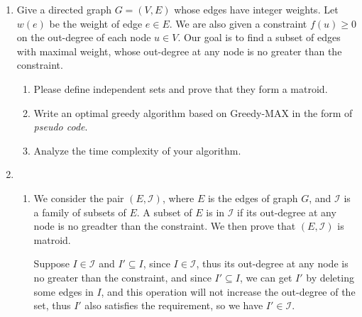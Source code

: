 \documentclass[12pt,a4paper]{article}
\makeatletter
\newtheorem*{solution}{Solution}
\theoremstyle{definition}
\renewenvironment{solution}[1][Solution] {\par\pushQED{\qed}\normalfont\topsep6\p@\@plus6\p@\relax\trivlist\item[\hskip\labelsep\bfseries#1\@addpunct{.}]\ignorespaces}{\popQED\endtrivlist\@endpefalse} \makeatother
\makeatother
\begin{document}
	\begin{enumerate}
		\item Give a directed graph $G=(V,E)$ whose edges have integer weights. Let $w(e)$ be the weight of edge $e\in E$. We are also given a constraint $f(u)\geq 0$ on the out-degree of each node $u\in V$. Our goal is to find a subset of edges with maximal weight, whose out-degree at any node is no greater than the constraint.
		\begin{enumerate}
			\item Please define independent sets and prove that they form a matroid.
			\item Write an optimal greedy algorithm based on Greedy-MAX in the form of \emph{pseudo code}.
			\item Analyze the time complexity of your algorithm.
		\end{enumerate}
		\begin{solution}
			\noindent
			\begin{enumerate}
				\item We consider the pair $(E,\mathcal{I})$, where $E$ is the edges of graph $G$, and $\mathcal{I}$ is a family of subsets of $E$. A subset of $E$ is in $\mathcal{I}$ if its out-degree at any node is no greadter than the constraint. We then prove that $(E,\mathcal{I})$ is matroid.
				
				Suppose $I \in \mathcal{I}$ and $I' \subseteq I$, since $I \in \mathcal{I}$, thus its out-degree at any node is no greater than the constraint, and since $I' \subseteq I$, we can get $I'$ by deleting some edges in $I$, and this operation will not increase the out-degree of the set, thus $I'$ also satisfies the requirement, so we have $I' \in \mathcal{I}$.
				
				

\end{enumerate}
\end{solution}
\end{enumerate}
\end{document}
